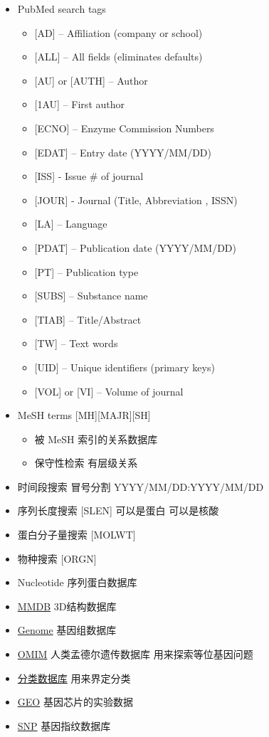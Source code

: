 \documentclass[]{book}
\providecommand{\tightlist}{%
  \setlength{\itemsep}{0pt}\setlength{\parskip}{0pt}}
\begin{document}
\begin{itemize}
\tightlist
\item
  PubMed search tags

  \begin{itemize}
  \tightlist
  \item
    {[}AD{]} -- Affiliation (company or school)
  \item
    {[}ALL{]} -- All fields (eliminates defaults)
  \item
    {[}AU{]} or {[}AUTH{]} -- Author
  \item
    {[}1AU{]} -- First author
  \item
    {[}ECNO{]} -- Enzyme Commission Numbers
  \item
    {[}EDAT{]} -- Entry date (YYYY/MM/DD)
  \item
    {[}ISS{]} - Issue \# of journal
  \item
    {[}JOUR{]} - Journal (Title, Abbreviation , ISSN)
  \item
    {[}LA{]} -- Language
  \item
    {[}PDAT{]} -- Publication date (YYYY/MM/DD)
  \item
    {[}PT{]} -- Publication type
  \item
    {[}SUBS{]} -- Substance name
  \item
    {[}TIAB{]} -- Title/Abstract
  \item
    {[}TW{]} -- Text words
  \item
    {[}UID{]} -- Unique identifiers (primary keys)
  \item
    {[}VOL{]} or {[}VI{]} -- Volume of journal
  \end{itemize}
\item
  MeSH terms {[}MH{]}{[}MAJR{]}{[}SH{]}

  \begin{itemize}
  \tightlist
  \item
    被 MeSH 索引的关系数据库
  \item
    保守性检索 有层级关系
  \end{itemize}
\item
  时间段搜索 冒号分割 YYYY/MM/DD:YYYY/MM/DD
\item
  序列长度搜索 {[}SLEN{]} 可以是蛋白 可以是核酸
\item
  蛋白分子量搜索 {[}MOLWT{]}
\item
  物种搜索 {[}ORGN{]}
\item
  Nucleotide 序列蛋白数据库
\item
  \href{http://www.ncbi.nlm.nih.gov/structure/}{MMDB} 3D结构数据库
\item
  \href{http://www.ncbi.nlm.nih.gov/genome/}{Genome} 基因组数据库
\item
  \href{http://omim.org/}{OMIM} 人类孟德尔遗传数据库 用来探索等位基因问题
\item
  \href{http://www.ncbi.nlm.nih.gov/taxonomy}{分类数据库} 用来界定分类
\item
  \href{http://www.ncbi.nlm.nih.gov/geo/}{GEO} 基因芯片的实验数据
\item
  \href{http://www.ncbi.nlm.nih.gov/snp/}{SNP} 基因指纹数据库
\end{itemize}
\end{document}
